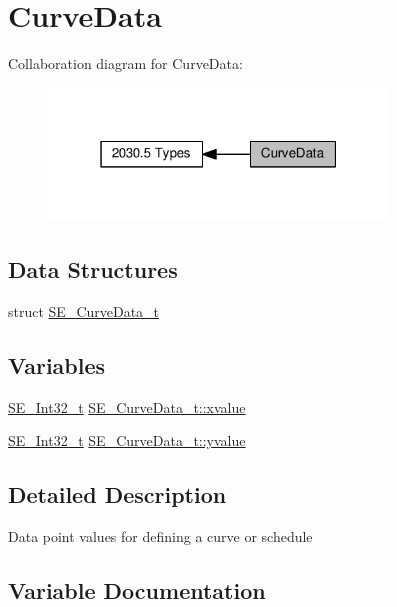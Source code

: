 \hypertarget{group__CurveData}{}\section{Curve\+Data}
\label{group__CurveData}
Collaboration diagram for Curve\+Data\+:\nopagebreak
\begin{figure}[H]
\begin{center}
\leavevmode
\includegraphics[width=256pt]{group__CurveData}
\end{center}
\end{figure}
\subsection*{Data Structures}
\begin{DoxyCompactItemize}
\item 
struct \hyperlink{structSE__CurveData__t}{S\+E\+\_\+\+Curve\+Data\+\_\+t}
\end{DoxyCompactItemize}
\subsection*{Variables}
\begin{DoxyCompactItemize}
\item 
\hyperlink{group__Int32_gaa7afc819cfc8033c5fa408e34da8b71a}{S\+E\+\_\+\+Int32\+\_\+t} \hyperlink{group__CurveData_gab9d114561fe7649670e94b5eb101119a}{S\+E\+\_\+\+Curve\+Data\+\_\+t\+::xvalue}
\item 
\hyperlink{group__Int32_gaa7afc819cfc8033c5fa408e34da8b71a}{S\+E\+\_\+\+Int32\+\_\+t} \hyperlink{group__CurveData_gaa753c6f9b2f10fb00d90d2aa26ed0489}{S\+E\+\_\+\+Curve\+Data\+\_\+t\+::yvalue}
\end{DoxyCompactItemize}


\subsection{Detailed Description}
Data point values for defining a curve or schedule 

\subsection{Variable Documentation}
\mbox{\label{group__CurveData_gab9d114561fe7649670e94b5eb101119a}} 
